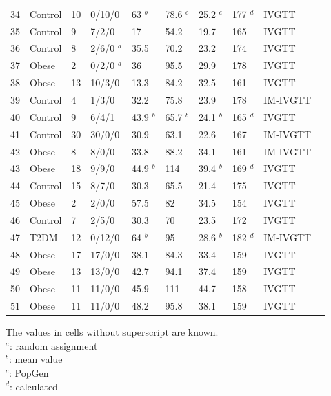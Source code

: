 \documentclass[utf8]{frontiersSCNS} %
\begin{document}
\begin{table}[h]
{\begin{tabular}{llllllllll}
34 & Control & 10 & 0/10/0  & 63 $^b$   & 78.6 $^c$ & 25.2 $^c$ & 177 $^d$ & IVGTT    & \cite{1998_AGING_Ahren}         \\
35 & Control & 9  & 7/2/0   & 17     & 54.2    & 19.7   & 165   & IVGTT    & \cite{pagano_1995}                      \\
36 & Control & 8  & 2/6/0 $^a$ & 35.5   & 70.2    & 23.2   & 174   & IVGTT    & \cite{2001_MyocInfarct_Cavallo} \\
37 & Obese   & 2  & 0/2/0 $^a$ & 36     & 95.5    & 29.9   & 178   & IVGTT    & \cite{2001_MyocInfarct_Cavallo} \\
38 & Obese   & 13 & 10/3/0  & 13.3   & 84.2    & 32.5   & 161   & IVGTT    & \cite{Cerutti1998}                      \\
39 & Control & 4  & 1/3/0   & 32.2   & 75.8    & 23.9   & 178   & IM-IVGTT & \cite{2002_AGENESIS_Roden}      \\
40 &
  Control &
  9 &
  6/4/1 &
  43.9 $^b$ &
  65.7 $^b$ &
  24.1 $^b$ &
  165 $^d$ &
  IVGTT &
  \cite{2008_hanisurya_thyroid} \\
41 & Control & 30 & 30/0/0  & 30.9   & 63.1    & 22.6   & 167   & IM-IVGTT & \cite{2012_pGDM_tura}           \\
42 & Obese   & 8  & 8/0/0   & 33.8   & 88.2    & 34.1   & 161   & IM-IVGTT & \cite{2012_pGDM_tura}           \\
43 & Obese   & 18 & 9/9/0   & 44.9 $^b$ & 114     & 39.4 $^b$ & 169 $^d$ & IVGTT    & \cite{Kautzky-Willer1992}                      \\
44 & Control & 15 & 8/7/0   & 30.3   & 65.5    & 21.4   & 175   & IVGTT    & \cite{Kautzky-Willer1992}                      \\
45 & Obese   & 2  & 2/0/0   & 57.5   & 82      & 34.5   & 154   & IVGTT    & \cite{Kautzky-Willer1992}                      \\
46 & Control & 7  & 2/5/0   & 30.3   & 70      & 23.5   & 172   & IVGTT    & \cite{alex_1996}                     \\
47 & T2DM    & 12 & 0/12/0  & 64 $^b$   & 95      & 28.6 $^b$ & 182 $^d$ & IM-IVGTT & \cite{2010_alcohol_ludvik}      \\
48 & Obese   & 17 & 17/0/0  & 38.1   & 84.3    & 33.4   & 159   & IVGTT    & \cite{2006_Davi_JACC}           \\
49 & Obese   & 13 & 13/0/0  & 42.7   & 94.1    & 37.4   & 159   & IVGTT    & \cite{2006_Davi_JACC}           \\
50 & Obese   & 11 & 11/0/0  & 45.9   & 111     & 44.7   & 158   & IVGTT    & \cite{2003_INFLAMMATORY_Davi}   \\
51 & Obese   & 11 & 11/0/0  & 48.2   & 95.8    & 38.1   & 159   & IVGTT    & \cite{2003_INFLAMMATORY_Davi}  \\ \hline
\end{tabular}}
The values in cells without superscript are known. \\ 
$^a$: random assignment \\
$^b$: mean value \\
$^c$: PopGen \\
$^d$: calculated \\
\end{table}
\end{document}
